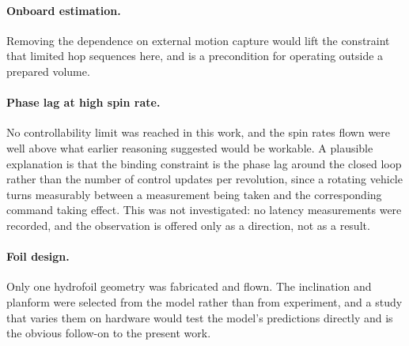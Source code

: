 \paragraph{Onboard estimation.}
Removing the dependence on external motion capture would lift the constraint
that limited hop sequences here, and is a precondition for operating outside a
prepared volume.

\paragraph{Phase lag at high spin rate.}
No controllability limit was reached in this work, and the spin rates flown
were well above what earlier reasoning suggested would be workable.  A
plausible explanation is that the binding constraint is the phase lag around
the closed loop rather than the number of control updates per revolution,
since a rotating vehicle turns measurably between a measurement being taken
and the corresponding command taking effect.  This was not investigated: no
latency measurements were recorded, and the observation is offered only as a
direction, not as a result.

\paragraph{Foil design.}
Only one hydrofoil geometry was fabricated and flown.  The inclination and
planform were selected from the model rather than from experiment, and a study
that varies them on hardware would test the model's predictions directly and
is the obvious follow-on to the present work.
